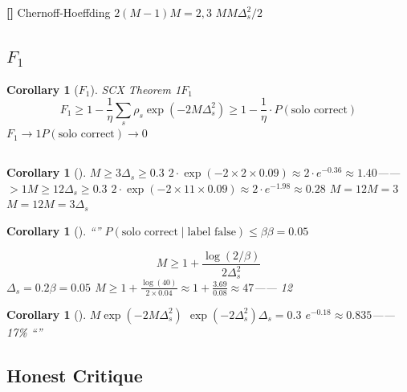\documentclass[11pt,a4paper]{article}
\newtheorem{corollary}[theorem]{Corollary}
\theoremstyle{remark}
\newcommand{\rigorous}{\textnormal{\textbf{[]}}}
\begin{document}
\rigorous{} \textbf{}Chernoff-Hoeffding
$2(M-1)$$M=2,3$
$M$$M\Delta_s^2/2$

\subsection{$F_1$}

\begin{corollary}[$F_1$]
\label{cor:f1_convergence}
SCX Theorem 1$F_1$
\begin{equation}
    F_1 \geq 1 - \frac{1}{\eta}\sum_s \rho_s \exp(-2M\Delta_s^2)
    \geq 1 - \frac{1}{\eta} \cdot P(\text{solo correct})
\end{equation}
$F_1 \to 1$$P(\text{solo correct}) \to 0$
\textbf{
}
\end{corollary}

\subsection{}

\begin{corollary}[]
\label{cor:corroboration}
$M \geq 3$$\Delta_s \geq 0.3$
$2 \cdot \exp(-2 \times 2 \times 0.09) \approx 2 \cdot e^{-0.36} \approx 1.40$——
$>1$$M \geq 12$$\Delta_s \geq 0.3$
$2 \cdot \exp(-2 \times 11 \times 0.09) \approx 2 \cdot e^{-1.98} \approx 0.28$
\textbf{$M=12$$M=3$
$M=12$$M=3$$\Delta_s$}
\end{corollary}

\begin{corollary}[]
\label{cor:reasonable_doubt}
``''\textbf{}
$P(\text{solo correct} \mid \text{label false}) \leq \beta$$\beta = 0.05$

\begin{equation}
    \boxed{M \geq 1 + \frac{\log(2/\beta)}{2\Delta_s^2}}
\end{equation}
$\Delta_s = 0.2$$\beta = 0.05$
$M \geq 1 + \frac{\log(40)}{2 \times 0.04} \approx 1 + \frac{3.69}{0.08} \approx 47$——
12\textbf{
}
\end{corollary}

\begin{corollary}[]
\label{cor:collegial}
$M$$\exp(-2M\Delta_s^2)$
$\exp(-2\Delta_s^2)$$\Delta_s = 0.3$
$e^{-0.18} \approx 0.835$——17\%
``''
\end{corollary}

\subsection{Honest Critique}
\end{document}
